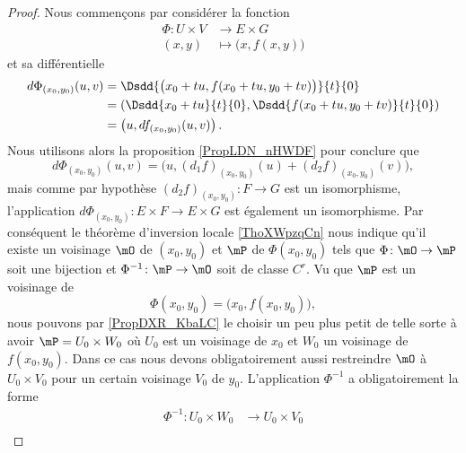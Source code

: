 \begin{proof}
    Nous commençons par considérer la fonction
    \begin{equation}
        \begin{aligned}
            \Phi\colon U\times V&\to E\times G \\
            (x,y)&\mapsto \big( x,f(x,y) \big)
        \end{aligned}
    \end{equation}
    et sa différentielle 
    \begin{subequations}
        \begin{align}
            d\Phi_{(x_0,y_0)}(u,v)&=\Dsdd{ \big( x_0+tu,f(x_0+tu,y_0+tv) \big) }{t}{0}\\
            &=\left( \Dsdd{ x_0+tu }{t}{0},\Dsdd{ f(x_0+tu,y_0+tv) }{t}{0} \right)\\
            &=\left( u,df_{(x_0,y_0)}(u,v) \right).
        \end{align}
    \end{subequations}
    Nous utilisons alors la proposition \ref{PropLDN_nHWDF} pour conclure que
    \begin{equation}
        d\Phi_{(x_0,y_0)}(u,v)=\big( u,(d_1f)_{(x_0,y_0)}(u)+(d_2f)_{(x_0,y_0)}(v) \big),
    \end{equation}
    mais comme par hypothèse \( (d_2f)_{(x_0,y_0)}\colon F\to G\) est un isomorphisme, l'application \( d\Phi_{(x_0,y_0)}\colon E\times F\to E\times G\) est également un isomorphisme. Par conséquent le théorème d'inversion locale \ref{ThoXWpzqCn} nous indique qu'il existe un voisinage \( \mO\) de \( (x_0,y_0)\) et \( \mP\) de \( \Phi(x_0,y_0)\) tels que \( \Phi\colon \mO\to \mP\) soit une bijection et \( \Phi^{-1}\colon \mP\to \mO\) soit de classe \( C^r\). Vu que \( \mP\) est un voisinage de
    \begin{equation}
        \Phi(x_0,y_0)=\big( x_0,f(x_0,y_0) \big),
    \end{equation}
    nous pouvons par \ref{PropDXR_KbaLC} le choisir un peu plus petit de telle sorte à avoir \( \mP=U_0\times W_0\) où \( U_0\) est un voisinage de \( x_0\) et \( W_0\) un voisinage de \( f(x_0,y_0)\). Dans ce cas nous devons obligatoirement aussi restreindre \( \mO\) à \( U_0\times V_0\) pour un certain voisinage \( V_0\) de \( y_0\). L'application \( \Phi^{-1}\) a obligatoirement la forme
    \begin{equation}    \label{EqMHT_QrHRn}
        \begin{aligned}
            \Phi^{-1}\colon U_0\times W_0&\to U_0\times V_0 \\

\end{aligned}
\end{equation}
\end{proof}
